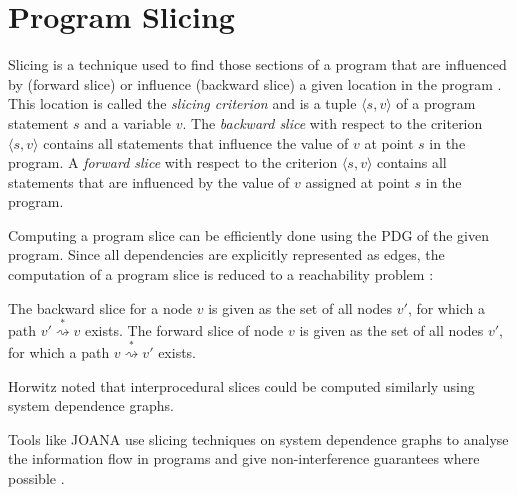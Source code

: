 \section{Program Slicing}

Slicing is a technique used to find those sections of a program that are influenced by (forward slice) or influence (backward slice) a given location in the program \cite{weiser81}.
This location is called the \emph{slicing criterion} and is a tuple $\langle s, v \rangle$ of a program statement $s$ and a variable $v$.
The \emph{backward slice} with respect to the criterion $\langle s, v \rangle$ contains all statements that influence the value of $v$ at point $s$ in the program. 
A \emph{forward slice} with respect to the criterion $\langle s, v \rangle$ contains all statements that are influenced by the value of $v$ assigned at point $s$ in the program.

Computing a program slice can be efficiently done using the PDG of the given program. Since all dependencies are explicitly represented as edges, the computation of a program slice is reduced to a reachability problem \cite{ottenstein84}: 

The backward slice for a node $v$ is given as the set of all nodes $v'$, for which a path $v' \stackrel{*}{\rightsquigarrow} v$ exists. The forward slice of node $v$ is given as the set of all nodes $v'$, for which a path $v \stackrel{*}{\rightsquigarrow} v'$ exists.

Horwitz \cite{horwitz88sdg} noted that interprocedural slices could be computed similarly using system dependence graphs.

Tools like JOANA use slicing techniques on system dependence graphs to analyse the information flow in programs and give non-interference guarantees where possible \cite{hammer09}.

